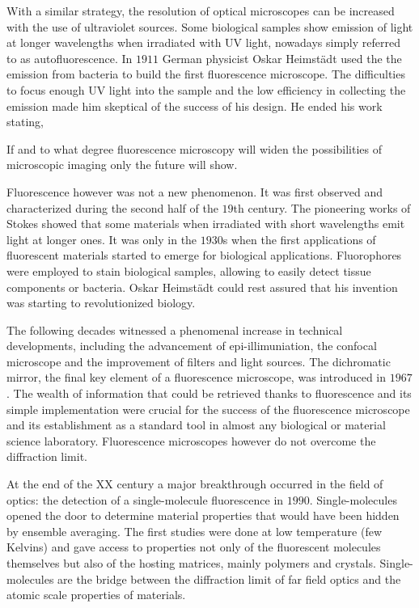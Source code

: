 With a similar strategy, the resolution of optical microscopes can be increased
with the use of ultraviolet sources. Some biological samples show emission of
light at longer wavelengths when irradiated with UV light, nowadays simply
referred to as autofluorescence. In $1911$ German physicist Oskar Heimst\"{a}dt
used the the emission from bacteria to build the first fluorescence
microscope\cite{Heimstadt1911}. The difficulties to focus enough UV light into
the sample and the low efficiency in collecting the emission made him skeptical
of the success of his design. He ended his work stating\cite{Rusk2009},

\begin{displayquote}
If and to what degree fluorescence microscopy will widen the possibilities of
microscopic imaging only the future will show.
\end{displayquote}

Fluorescence however was not a new phenomenon. It was first observed and
characterized during the second half of the $19$th century. The pioneering works
of Stokes showed that some materials when irradiated with short wavelengths emit
light at longer ones. It was only in the $1930$s when the first applications of
fluorescent materials started to emerge for biological applications.
Fluorophores were employed to stain biological samples, allowing to easily
detect tissue components or bacteria. Oskar Heimst\"{a}dt could rest assured
that his invention was starting to revolutionized biology. 

The following decades witnessed a phenomenal increase in technical developments,
including the advancement of epi-illimuniation, the confocal microscope and the
improvement of filters and light sources. The dichromatic mirror, the final key
element of a fluorescence microscope, was introduced in $1967$\cite{Ploem1967}.
The wealth of information that could be retrieved thanks to fluorescence and its
simple implementation were crucial for the success of the fluorescence
microscope and its establishment as a standard tool in almost any biological or
material science laboratory. Fluorescence microscopes however do not overcome
the diffraction limit. 

At the end of the XX century a major breakthrough occurred in the field of
optics: the detection of a single-molecule fluorescence in
$1990$\cite{PhysRevLett.65.2716}. Single-molecules opened the door to determine
material properties that would have been hidden by ensemble averaging.
The first studies were done at low temperature (few Kelvins) and gave access to
properties not only of the fluorescent molecules themselves but also of the
hosting matrices, mainly polymers and crystals. Single-molecules are the bridge
between the diffraction limit of far field optics and the atomic scale
properties of materials. 


